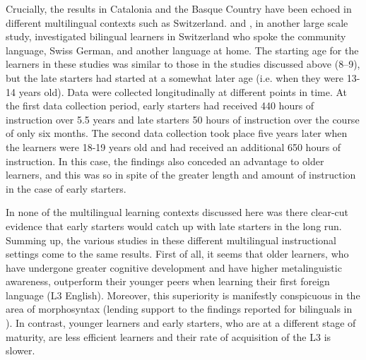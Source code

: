 \documentclass[output=paper]{../langscibook}
\begin{document}
Crucially, the results in Catalonia and the Basque Country have been echoed in different multilingual contexts such as Switzerland. \citet{Pfenninger2014} and \citet{PfenningerSingleton2017,PfenningerSingleton2019}, in another large scale study, investigated bilingual learners in Switzerland who spoke the community language, Swiss German, and another language at home. The starting age for the learners in these studies was similar to those in the studies discussed above (8--9), but the late starters had started at a somewhat later age (i.e. when they were 13-14 years old). Data were collected longitudinally at different points in time. At the first data collection period, early starters had received 440 hours of instruction over 5.5 years and late starters 50 hours of instruction over the course of only six months. The second data collection took place five years later when the learners were 18-19 years old and had received an additional 650 hours of instruction. In this case, the findings also conceded an advantage to older learners, and this was so in spite of the greater length and amount of instruction in the case of early starters.

In none of the multilingual learning contexts discussed here was there clear-cut evidence that early starters would catch up with late starters in the long run. Summing up, the various studies in these different multilingual instructional settings come to the same results. First of all, it seems that older learners, who have undergone greater cognitive development and have higher metalinguistic awareness, outperform their younger peers when learning their first foreign language (L3 English). Moreover, this superiority is manifestly conspicuous in the area of morphosyntax (lending support to the findings reported for bilinguals in \citealt{KrashenEtAl1979}). In contrast, younger learners and early starters, who are at a different stage of maturity, are less efficient learners and their rate of acquisition of the L3 is slower.
\end{document}

